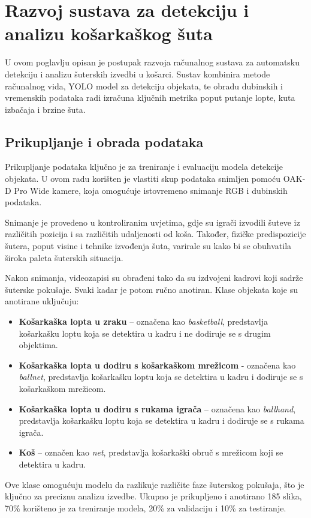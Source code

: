 \documentclass[zavrsnirad]{fer}
\begin{document}
\chapter{Razvoj sustava za detekciju i analizu košarkaškog šuta}
\label{pog:razvoj_sustava_za_detekciju_i_analizu_kosarkaskog_suta}
U ovom poglavlju opisan je postupak razvoja računalnog sustava za automatsku detekciju i analizu šuterskih izvedbi u košarci. 
Sustav kombinira metode računalnog vida, YOLO model za detekciju objekata, te obradu dubinskih i vremenskih podataka radi izračuna ključnih metrika poput putanje lopte, kuta izbačaja i brzine šuta.

\section{Prikupljanje i obrada podataka}
\label{pog:prikupljanje_i_obrada_podataka}
Prikupljanje podataka ključno je za treniranje i evaluaciju modela detekcije objekata.
U ovom radu korišten je vlastiti skup podataka snimljen pomoću OAK-D Pro Wide kamere, koja omogućuje istovremeno snimanje RGB i dubinskih podataka.

Snimanje je provedeno u kontroliranim uvjetima, gdje su igrači izvodili šuteve iz različitih pozicija i sa različitih udaljenosti od koša.
Također, fizičke predispozicije šutera, poput visine i tehnike izvođenja šuta, varirale su kako bi se obuhvatila široka paleta šuterskih situacija.

Nakon snimanja, videozapisi su obrađeni tako da su izdvojeni kadrovi koji sadrže šuterske pokušaje.
Svaki kadar je potom ručno anotiran.
Klase objekata koje su anotirane uključuju:
\begin{itemize}
  \item \textbf{Košarkaška lopta u zraku} – označena kao \textit{basketball}, predstavlja košarkašku loptu koja se detektira u kadru i ne dodiruje se s drugim objektima.
  \item \textbf{Košarkaška lopta u dodiru s košarkaškom mrežicom} - označena kao \textit{ballnet}, predstavlja košarkašku loptu koja se detektira u kadru i dodiruje se s košarkaškom mrežicom.
  \item \textbf{Košarkaška lopta u dodiru s rukama igrača} – označena kao \textit{ballhand}, predstavlja košarkašku loptu koja se detektira u kadru i dodiruje se s rukama igrača.
  \item \textbf{Koš} – označen kao \textit{net}, predstavlja košarkaški obruč s mrežicom koji se detektira u kadru.
\end{itemize}
Ove klase omogućuju modelu da razlikuje različite faze šuterskog pokušaja, što je ključno za preciznu analizu izvedbe.
Ukupno je prikupljeno i anotirano 185 slika, 70\% korišteno je za treniranje modela, 20\% za validaciju i 10\% za testiranje.
\end{document}
